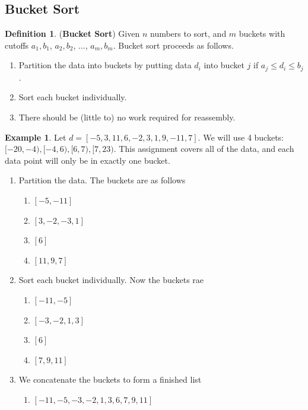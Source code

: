 \documentclass[12pt]{article}
\numberwithin{equation}{section}
\theoremstyle{theorem}
\theoremstyle{definition}
\newtheorem{definition}{Definition}[section]
\newtheorem{example}{Example}[section]
\theoremstyle{remark}
\begin{document}
\subsection{Bucket Sort}
\begin{definition} (\textbf{Bucket Sort}) Given $n$ numbers to sort, and $m$ buckets with cutoffs $a_1, b_1$, $a_2, b_2$, $\dots$, $a_m, b_m$.  Bucket sort proceeds as follows.  
\begin{enumerate}
\item Partition the data into buckets by putting data $d_i$ into bucket $j$ if $a_j \leq d_i \leq b_j$.  
\item Sort each bucket individually.  
\item There should be (little to) no work required for reassembly.
\end{enumerate}
\end{definition}

\begin{example} Let $d = [-5, 3, 11, 6, -2, 3, 1, 9, -11, 7]$.  We will use 4 buckets: $[-20, -4), [-4, 6), [6, 7), [7, 23)$.  This assignment covers all of the data, and each data point will only be in exactly one bucket.
\begin{enumerate}
\item Partition the data. The buckets are as follows
	\begin{enumerate}
	\item $[-5, -11]$
	\item $[3, -2, -3, 1]$
	\item $[6]$
	\item $[11, 9, 7]$
	\end{enumerate}
\item Sort each bucket individually. Now the buckets rae
	\begin{enumerate}
	\item $[-11, -5]$
	\item $[-3, -2, 1, 3]$
	\item $[6]$
	\item $[7, 9, 11]$
	\end{enumerate}
\item We concatenate the buckets to form a finished list
	\begin{enumerate}
	\item $[-11, -5, -3, -2, 1, 3, 6, 7, 9, 11]$
	\end{enumerate}
\end{enumerate}
\end{example}
\end{document}
